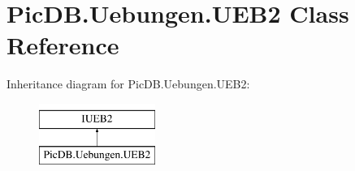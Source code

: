\hypertarget{class_pic_d_b_1_1_uebungen_1_1_u_e_b2}{}\section{Pic\+D\+B.\+Uebungen.\+U\+E\+B2 Class Reference}
\label{class_pic_d_b_1_1_uebungen_1_1_u_e_b2}
Inheritance diagram for Pic\+D\+B.\+Uebungen.\+U\+E\+B2\+:\begin{figure}[H]
\begin{center}
\leavevmode
\includegraphics[height=2.000000cm]{class_pic_d_b_1_1_uebungen_1_1_u_e_b2}
\end{center}
\end{figure}
